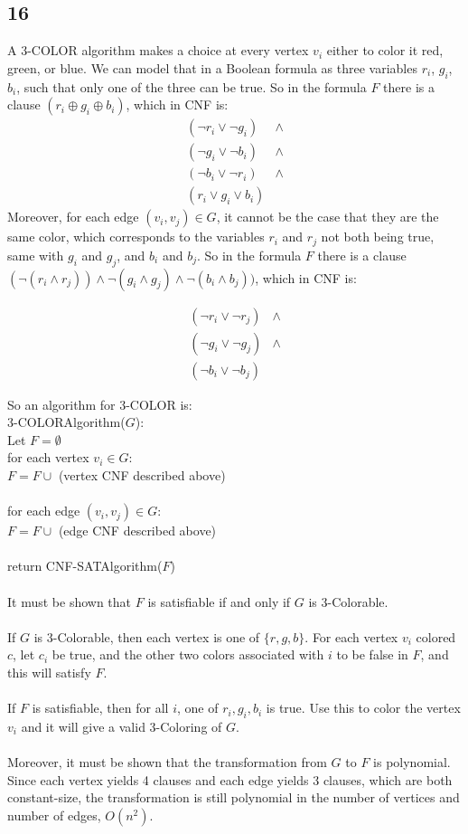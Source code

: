 \documentclass[letterpaper,notitlepage,twoside]{article}
\newcommand{\union}{\cup}
\newcommand\tab[1][1cm]{\hspace*{#1}} %
\begin{document}
\subsection*{16}
A 3-COLOR algorithm makes a choice at every vertex $v_i$ either to color it red, green, or blue. We can model that in a Boolean formula as three variables $r_i$, $g_i$, $b_i$, such that only one of the three can be true. So in the formula $F$ there is a clause $(r_i \oplus g_i \oplus b_i)$, which in CNF is:
\begin{align*}
(\neg r_i \lor \neg g_i) &\land \\
(\neg g_i \lor \neg b_i) &\land \\
(\neg b_i \lor \neg r_i) &\land \\
(r_i \lor g_i \lor b_i) 
\end{align*}
Moreover, for each edge $(v_i, v_j) \in G$, it cannot be the case that they are the same color, which corresponds to the variables $r_i$ and $r_j$ not both being true, same with $g_i$ and $g_j$, and $b_i$ and $b_j$. So in the formula $F$ there is a clause $(\neg (r_i \land r_j)) \land \neg (g_i \land g_j) \land \neg (b_i \land b_j))$, which in CNF is:

\begin{align*}
(\neg r_i \lor \neg r_j) &\land \\
(\neg g_i \lor \neg g_j) &\land \\
(\neg b_i \lor \neg b_j)
\end{align*}

So an algorithm for 3-COLOR is:\\
3-COLORAlgorithm($G$):\\
\tab Let $F = \emptyset$ \\
\tab for each vertex $v_i \in G$: \\
\tab\tab $F = F \union$ (vertex CNF described above)
\\\\
\tab for each edge $(v_i, v_j) \in G$: \\
\tab\tab $F = F \union$ (edge CNF described above)
\\\\
\tab return CNF-SATAlgorithm($F$)
\\\\

It must be shown that $F$ is satisfiable if and only if $G$ is 3-Colorable.
\\\\
If $G$ is 3-Colorable, then each vertex is one of $\{r, g, b\}$. For each vertex $v_i$ colored $c$, let $c_i$ be true, and the other two colors associated with $i$ to be false in $F$, and this will satisfy $F$.
\\\\
If $F$ is satisfiable, then for all $i$, one of $r_i, g_i, b_i$ is true. Use this to color the vertex $v_i$ and it will give a valid 3-Coloring of $G$.
\\\\
Moreover, it must be shown that the transformation from $G$ to $F$ is polynomial. Since each vertex yields 4 clauses and each edge yields 3 clauses, which are both constant-size, the transformation is still polynomial in the number of vertices and number of edges, $O(n^2)$.
\end{document}
